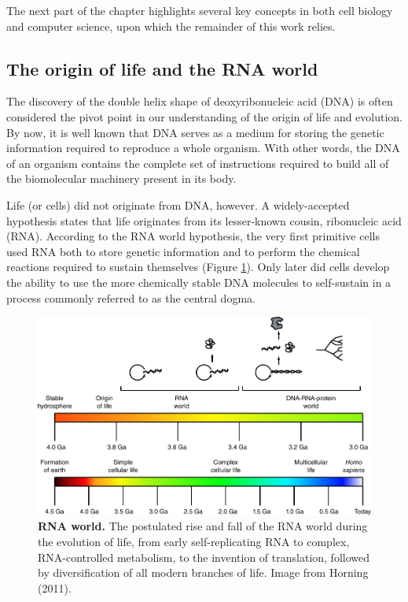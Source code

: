 The next part of the chapter highlights several key concepts in both cell biology and computer science, upon which the remainder of this work relies.

\subsection{The origin of life and the RNA world}
The discovery of the double helix shape of deoxyribonucleic acid (DNA)\cite{watson_molecularstructurenucleic_1953} is often considered the pivot point in our understanding of the origin of life and evolution. By now, it is well known that DNA serves as a medium for storing the genetic information required to reproduce a whole organism. With other words, the DNA of an organism contains the complete set of instructions required to build all of the biomolecular machinery present in its body. 

Life (or cells) did not originate from DNA, however. A widely-accepted hypothesis states that life originates from its lesser-known cousin, ribonucleic acid (RNA). According to the RNA world hypothesis\cite{alberts_rnaworldorigins_2002}, the very first primitive cells used RNA both to store genetic information and to perform the chemical reactions required to sustain themselves (Figure \ref{fig:rnaworld}). Only later did cells develop the ability to use the more chemically stable DNA molecules to self-sustain in a process commonly referred to as the central dogma.

\begin{figure}[htb!]
	\centering\includegraphics[width=.5\linewidth]{fig/rnaworld} %
	\caption{
		\textbf{RNA world.} The postulated rise and fall of the RNA world during the evolution of life, from early self-replicating RNA to complex, RNA-controlled metabolism, to the invention of translation, followed by diversification of all modern branches of life. Image from Horning (2011)\cite{horning_rnaworld_2011}.
	}
	\label{fig:rnaworld}
\end{figure}

